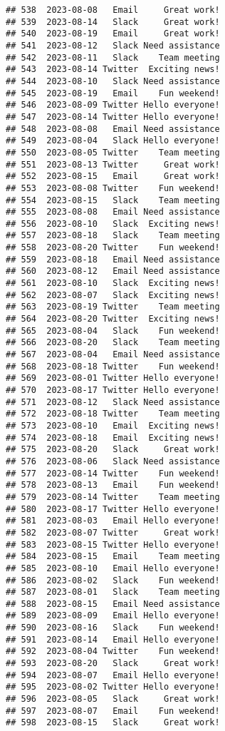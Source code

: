 \documentclass[
]{article}
\begin{document}
\begin{verbatim}
## 538  2023-08-08   Email     Great work!
## 539  2023-08-14   Slack     Great work!
## 540  2023-08-19   Email     Great work!
## 541  2023-08-12   Slack Need assistance
## 542  2023-08-11   Slack    Team meeting
## 543  2023-08-14 Twitter  Exciting news!
## 544  2023-08-10   Slack Need assistance
## 545  2023-08-19   Email    Fun weekend!
## 546  2023-08-09 Twitter Hello everyone!
## 547  2023-08-14 Twitter Hello everyone!
## 548  2023-08-08   Email Need assistance
## 549  2023-08-04   Slack Hello everyone!
## 550  2023-08-05 Twitter    Team meeting
## 551  2023-08-13 Twitter     Great work!
## 552  2023-08-15   Email     Great work!
## 553  2023-08-08 Twitter    Fun weekend!
## 554  2023-08-15   Slack    Team meeting
## 555  2023-08-08   Email Need assistance
## 556  2023-08-10   Slack  Exciting news!
## 557  2023-08-18   Slack    Team meeting
## 558  2023-08-20 Twitter    Fun weekend!
## 559  2023-08-18   Email Need assistance
## 560  2023-08-12   Email Need assistance
## 561  2023-08-10   Slack  Exciting news!
## 562  2023-08-07   Slack  Exciting news!
## 563  2023-08-19 Twitter    Team meeting
## 564  2023-08-20 Twitter  Exciting news!
## 565  2023-08-04   Slack    Fun weekend!
## 566  2023-08-20   Slack    Team meeting
## 567  2023-08-04   Email Need assistance
## 568  2023-08-18 Twitter    Fun weekend!
## 569  2023-08-01 Twitter Hello everyone!
## 570  2023-08-17 Twitter Hello everyone!
## 571  2023-08-12   Slack Need assistance
## 572  2023-08-18 Twitter    Team meeting
## 573  2023-08-10   Email  Exciting news!
## 574  2023-08-18   Email  Exciting news!
## 575  2023-08-20   Slack     Great work!
## 576  2023-08-06   Slack Need assistance
## 577  2023-08-14 Twitter    Fun weekend!
## 578  2023-08-13   Email    Fun weekend!
## 579  2023-08-14 Twitter    Team meeting
## 580  2023-08-17 Twitter Hello everyone!
## 581  2023-08-03   Email Hello everyone!
## 582  2023-08-07 Twitter     Great work!
## 583  2023-08-15 Twitter Hello everyone!
## 584  2023-08-15   Email    Team meeting
## 585  2023-08-10   Email Hello everyone!
## 586  2023-08-02   Slack    Fun weekend!
## 587  2023-08-01   Slack    Team meeting
## 588  2023-08-15   Email Need assistance
## 589  2023-08-09   Email Hello everyone!
## 590  2023-08-16   Slack    Fun weekend!
## 591  2023-08-14   Email Hello everyone!
## 592  2023-08-04 Twitter    Fun weekend!
## 593  2023-08-20   Slack     Great work!
## 594  2023-08-07   Email Hello everyone!
## 595  2023-08-02 Twitter Hello everyone!
## 596  2023-08-05   Slack     Great work!
## 597  2023-08-07   Email    Fun weekend!
## 598  2023-08-15   Slack     Great work!

\end{verbatim}
\end{document}
